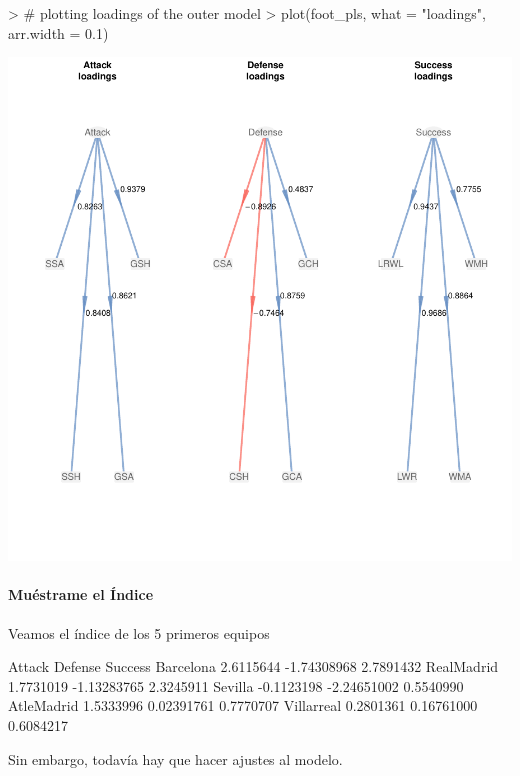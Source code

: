 \documentclass{paper}
\begin{document}
\begin{center}
\begin{Schunk}
\begin{Sinput}
> # plotting loadings of the outer model
> plot(foot_pls, what = "loadings", arr.width = 0.1)
\end{Sinput}
\end{Schunk}
\includegraphics{notas_PLS-016}
\end{center}

\paragraph{Mu\'estrame el \'Indice}

Veamos el \'indice de los 5 primeros equipos
\begin{Schunk}
\begin{Soutput}
               Attack     Defense   Success
Barcelona   2.6115644 -1.74308968 2.7891432
RealMadrid  1.7731019 -1.13283765 2.3245911
Sevilla    -0.1123198 -2.24651002 0.5540990
AtleMadrid  1.5333996  0.02391761 0.7770707
Villarreal  0.2801361  0.16761000 0.6084217
\end{Soutput}
\end{Schunk}

Sin embargo, todav\'ia hay que hacer ajustes al modelo.
\end{document}
